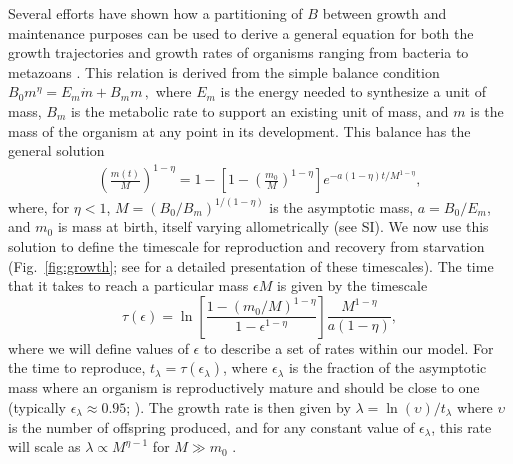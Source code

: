 \documentclass{pnastwo}
\begin{document}
\begin{article}
Several efforts have shown how a partitioning of $B$ between growth and
maintenance purposes can be used to derive a general equation for both the
growth trajectories and growth rates of organisms ranging from bacteria to
metazoans
\cite{West:2001bv,moses2008rmo,gillooly2002esa,hou,Kempes:2012hy}. This relation is derived from the simple balance condition 
$B_{0}m^{\eta}=E_{m}\dot{m}+B_{m}m\,,$
\cite{West:2001bv,moses2008rmo,gillooly2002esa,hou,Kempes:2012hy} where $E_{m}$ is the energy needed to synthesize a unit of mass, $B_{m}$ is
the metabolic rate to support an existing unit of mass, and $m$ is the mass
of the organism at any point in its development.  This balance has the
general solution \cite{bettencourt,Kempes:2012hy}
\begin{eqnarray}
\label{m1}
\left(\frac{m\left(t\right)}{M}\right)^{1-\eta}\!=1\!-\!\left[1\!-\!\left(\frac{m_{0}}{M}\right)^{1\!-\!\eta}\right]e^{-a\left(1\!-\!\eta\right)t/M^{1-\eta}},
\end{eqnarray}
where, for $\eta<1$, $M=(B_{0}/B_{m})^{1/(1-\eta)}$ is the asymptotic mass, $a=B_{0}/E_{m}$, and $m_0$ is mass at birth, itself varying allometrically (see SI).  We now use this solution to define the timescale for reproduction and recovery from starvation (Fig.~\ref{fig:growth}; see \cite{moses2008rmo} for a detailed presentation of these timescales). The time that it takes to reach a particular mass $\epsilon M$ is given by the timescale
\begin{equation}
\label{t1}
\tau\left(\epsilon\right) = \ln\left[\frac{1-\left(m_{0}/M\right)^{1-\eta}}{1-\epsilon^{1-\eta}}\right]\frac{M^{1-\eta}}{a\left(1-\eta\right)},
\end{equation}
where we will define values of $\epsilon$ to describe a set of rates within our model. For the time to reproduce, $t_{\lambda}=\tau\left(\epsilon_{\lambda}\right)$, where $\epsilon_{\lambda}$ is the fraction of the asymptotic mass where an organism is reproductively mature and should be close to one (typically $\epsilon_{\lambda}\approx0.95$; \cite{West:2001bv}). The growth rate is then given by $\lambda=\ln\left(\upsilon\right)/t_{\lambda}$ where $\upsilon$ is the number of offspring produced, and for any constant value of $\epsilon_{\lambda}$, this rate will scale as $\lambda\propto M^{\eta-1}$ for $M\gg m_{0}$ \cite{West:2001bv,moses2008rmo,gillooly2002esa,hou,Kempes:2012hy}.



\end{article}
\end{document}
